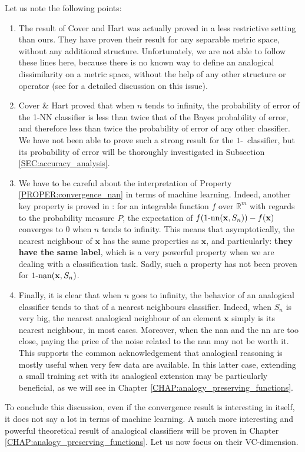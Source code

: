 Let us note the following points:
\begin{enumerate}
\item The result of Cover and Hart was actually proved in a less restrictive
  setting than ours. They have proven their result for any separable metric
    space, without any additional structure. Unfortunately, we are not able to
    follow these lines here, because there is no known way to define an
    analogical dissimilarity on a metric space, without the help of any other
    structure or operator (see \cite{MicBayDelJAIR08} for a detailed discussion
    on this issue).
  \item Cover \& Hart proved that when $n$ tends to infinity, the probability
    of error of the 1-NN classifier is less than twice that of the Bayes
    probability of error, and therefore less than twice the probability of error of
    any other classifier. We have not been able to prove such a strong result
    for the $1$-\NAN~classifier, but its probability of error will be thoroughly
    investigated in Subsection \ref{SEC:accuracy_analysis}.
  \item We have to be careful about the interpretation of Property
    \ref{PROPER:convergence_nan} in terms of machine learning. Indeed, another
    key property is proved in \cite{CovHarTIT67}: for an integrable
    function $f$  over $\mathbb{R}^m$ with regards to the probability measure $P$, the
    expectation of $f(1\mbox{-nn}(\mathbf{x},S_n))- f(\mathbf{x})$ converges to 0 when
    $n$ tends to infinity.  This means that asymptotically, the nearest
    neighbour of $\mathbf{x}$ has the same properties as $\mathbf{x}$, and
    particularly: \textbf{they have the same label}, which is a very powerful
    property when we are dealing with a classification task. Sadly, such a
    property has not been proven for $1\text{-nan}(\mathbf{x}, S_n)$.
\item Finally, it is clear that when $n$ goes to infinity, the behavior of an
  analogical classifier tends to that of a nearest neighbours classifier.
    Indeed, when $S_n$ is very big, the nearest analogical neighbour of an
    element $\mathbf{x}$ simply is its nearest neighbour, in most cases.
    Moreover, when the nan and the nn are too close, paying the price of the
    noise related to the nan may not be worth it. This supports the common
    acknowledgement that analogical reasoning is mostly useful when very few
    data are available.  In this latter case, extending a small training set with
    its analogical extension may be particularly beneficial, as we will see in
    Chapter \ref{CHAP:analogy_preserving_functions}.

\end{enumerate}
To conclude this discussion, even if the convergence result is interesting in
itself, it does not say a lot in terms of machine learning. A much more
interesting and powerful theoretical result of analogical classifiers will be
proven in Chapter \ref{CHAP:analogy_preserving_functions}. Let us now focus on
their VC-dimension.

